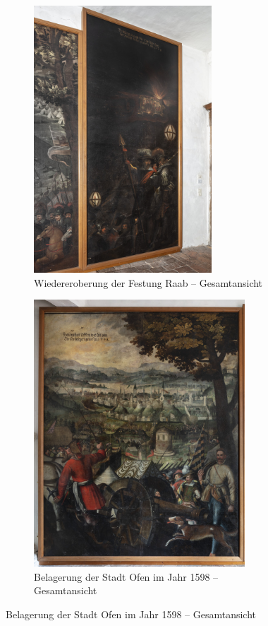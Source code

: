 \documentclass[
  a4paper,
]{book}
\begin{document}
\begin{figure}
\begin{figure}[H]    
  \includegraphics[height=10cm]{images/fmd10005846a.jpg}
  \caption{Wiedereroberung der Festung Raab – Gesamtansicht}
  \label{fig:{images/fmd10005846a.jpg}}
\end{figure}

\clearpage

\begin{figure}[H]    
  \includegraphics[height=10cm]{images/fmd10005847a.jpg}
  \caption{Belagerung der Stadt Ofen im Jahr 1598 – Gesamtansicht}
  \label{fig:{images/fmd10005847a.jpg}}
\end{figure}

\clearpage


\end{figure}
\end{document}
